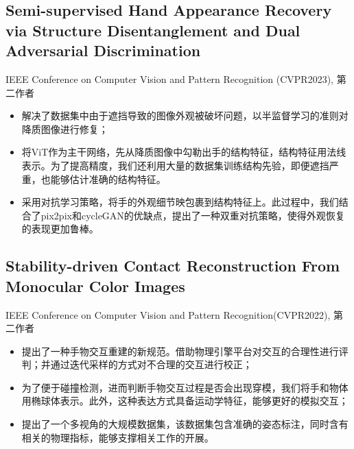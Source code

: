 \documentclass{resume}
\begin{document}
\subsection{\textbf{Semi-supervised Hand Appearance Recovery via Structure Disentanglement and Dual Adversarial Discrimination}}
IEEE Conference on Computer Vision and Pattern Recognition (CVPR2023), 第二作者
\begin{itemize}
  \item 解决了数据集中由于遮挡导致的图像外观被破坏问题，以半监督学习的准则对降质图像进行修复；
  \item 将ViT作为主干网络，先从降质图像中勾勒出手的结构特征，结构特征用法线表示。为了提高精度，我们还利用大量的数据集训练结构先验，即便遮挡严重，也能够估计准确的结构特征。
  \item 采用对抗学习策略，将手的外观细节映包裹到结构特征上。此过程中，我们结合了pix2pix和cycleGAN的优缺点，提出了一种双重对抗策略，使得外观恢复的表现更加鲁棒。
\end{itemize}
\vspace{-2mm}

\subsection{\textbf{Stability-driven Contact Reconstruction From Monocular Color Images}}
IEEE Conference on Computer Vision and Pattern Recognition(CVPR2022),  第二作者
\begin{itemize}
  \item 提出了一种手物交互重建的新规范。借助物理引擎平台对交互的合理性进行评判；并通过迭代采样的方式对不合理的交互进行校正；
  \item 为了便于碰撞检测，进而判断手物交互过程是否会出现穿模，我们将手和物体用椭球体表示。此外，这种表达方式具备运动学特征，能够更好的模拟交互；
  \item 提出了一个多视角的大规模数据集，该数据集包含准确的姿态标注，同时含有相关的物理指标，能够支撑相关工作的开展。
\end{itemize}


\end{document}
